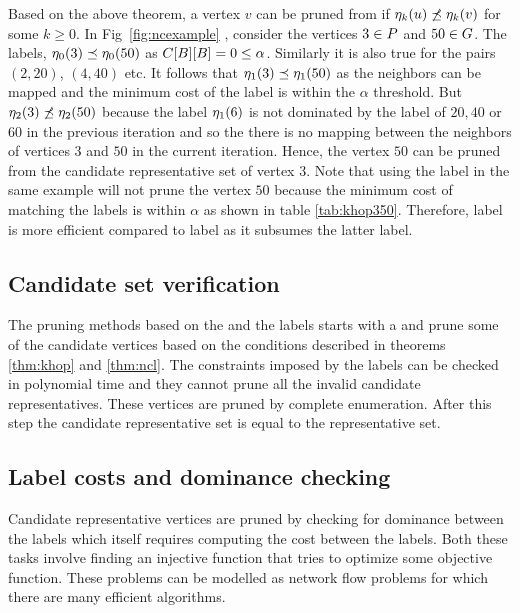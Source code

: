 Based on the above theorem, a vertex $v$ can be pruned from 
\CR if $\eta_{k}(u) \not\preceq \eta_{k}(v)$
for some $k \geq 0$. In Fig~\ref{fig:ncexample} , consider the vertices
$3 \in P$ and $50 \in G$. The \ncl labels, 
$\eta_{0}(3) \preceq \eta_{0}(50)$ as ${C}[B][B] = 0 \leq \alpha$.
Similarly it is also true for the pairs $(2, 20)$, $(4, 40)$ etc. It follows
that $\eta_{1}(3) \preceq \eta_{1}(50)$ as the neighbors can be mapped and
the minimum cost of the \khop label is within the $\alpha$ threshold. But
$\eta_{2}(3) \not\preceq \eta_{2}(50)$ because the \ncl label
$\eta_{1}(6)$ is not dominated by the \ncl label
of $20, 40$ or  $60$ in the previous iteration and so the
there is no mapping between the neighbors of vertices $3$ and 
$50$ in the current iteration. Hence, the vertex $50$
can be pruned from the candidate representative set of vertex $3$.
Note that using the \khop label in the same example will not prune the
vertex $50$ because the minimum cost of matching the \khop labels is within
$\alpha$ as shown in table \ref{tab:khop350}. Therefore, \ncl label is more
efficient compared to \khop label as it subsumes the latter label.

\subsection{Candidate set verification}
The pruning methods based on the \khop and the \ncl labels starts with a
\CR and prune some of the candidate vertices
based on the conditions described in theorems \ref{thm:khop} and \ref{thm:ncl}.
The constraints imposed by the labels can be checked in polynomial time
and they cannot prune all the invalid candidate representatives. These vertices
are pruned by complete enumeration. After this step the candidate representative
set is equal to the representative set.

\subsection{Label costs and dominance checking}
Candidate representative vertices are pruned by checking for dominance between
the \ncl labels which itself requires computing the cost between the \khop labels.
Both these tasks involve finding an injective function that tries to optimize
some objective function. These problems can be modelled as network flow problems
for which there are many efficient algorithms. 

